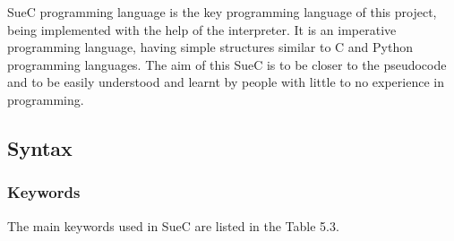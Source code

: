 \documentclass[12pt,a4paper,twoside]{report}
\begin{document}
SueC programming language is the key programming language of this project, being implemented with the help of the interpreter. It is an imperative programming language, having simple structures similar to C and Python programming languages. The aim of this SueC is to be closer to the pseudocode and to be easily understood and learnt by people with little to no experience in programming.

\subsection{Syntax}

\subsubsection{Keywords}
	The main keywords used in SueC are listed in the Table 5.3.
	
\end{document}
